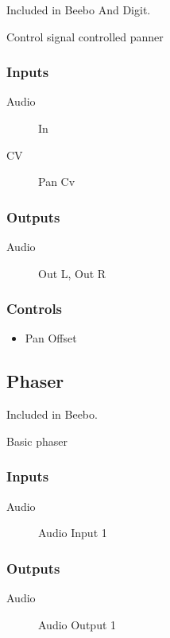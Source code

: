 Included in Beebo And Digit.

Control signal controlled panner



\subsubsection{Inputs}
\begin{description}
\item [Audio] In
\item [CV] Pan Cv
\end{description}

\subsubsection{Outputs}
\begin{description}
\item [Audio] Out L, Out R
\end{description}

\subsubsection{Controls}
\begin{itemize}
\item Pan Offset
\end{itemize}

\subsection{Phaser}

Included in Beebo.

Basic phaser



\subsubsection{Inputs}
\begin{description}
\item [Audio] Audio Input 1
\end{description}

\subsubsection{Outputs}
\begin{description}
\item [Audio] Audio Output 1
\end{description}

